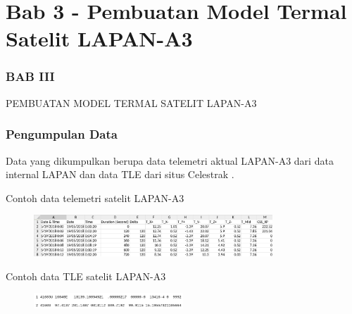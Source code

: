 \documentclass[8pt]{beamer}
\begin{document}
\section{Bab 3 - Pembuatan Model Termal Satelit LAPAN-A3}
\begin{frame}
  \frametitle{BAB III}
  \center \large PEMBUATAN MODEL TERMAL SATELIT LAPAN-A3
\end{frame}
\begin{frame}
  \frametitle{Pengumpulan Data}
  Data yang dikumpulkan berupa data telemetri aktual LAPAN-A3 dari data internal LAPAN dan data TLE dari situs Celestrak \cite{kelso}.
  \begin{block}{\center Contoh data telemetri satelit LAPAN-A3}
      \begin{figure}
          \includegraphics[width=0.8\textwidth]{figure/telea3.png}
      \end{figure}
    \end{block}
    \begin{block}{\center Contoh data TLE satelit LAPAN-A3}
      \begin{figure}
          \includegraphics[width=0.5\textwidth]{figure/tlea3.png}
      \end{figure}
    \end{block}
\end{frame}
\end{document}
